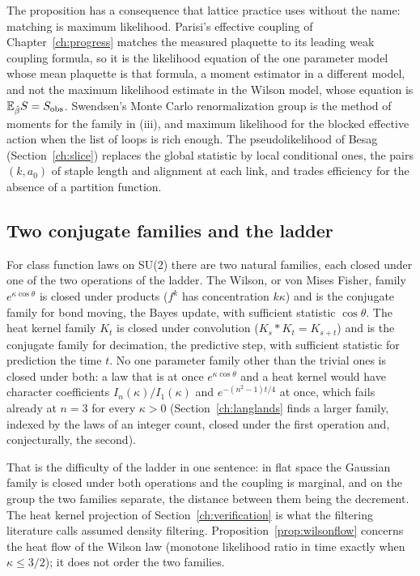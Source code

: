 The proposition has a consequence that lattice practice uses without the name: matching is maximum likelihood. Parisi's effective coupling \cite{Pa80} of Chapter~\ref{ch:progress} matches the measured plaquette to its leading weak coupling formula, so it is the likelihood equation of the one parameter model whose mean plaquette is that formula, a moment estimator in a different model, and not the maximum likelihood estimate in the Wilson model, whose equation is $\mathbb{E}_{\hat\beta}S=S_{\mathrm{obs}}$. Swendsen's Monte Carlo renormalization group \cite{Sw79} is the method of moments for the family in (iii), and maximum likelihood for the blocked effective action when the list of loops is rich enough. The pseudolikelihood of Besag \cite{Be74,Be75} (Section~\ref{ch:slice}) replaces the global statistic by local conditional ones, the pairs $(k,a_0)$ of staple length and alignment at each link, and trades efficiency for the absence of a partition function.

\subsection{Two conjugate families and the ladder}

For class function laws on SU(2) there are two natural families, each closed under one of the two operations of the ladder. The Wilson, or von Mises Fisher, family $e^{\kappa\cos\theta}$ is closed under products ($f^k$ has concentration $k\kappa$) and is the conjugate family for bond moving, the Bayes update, with sufficient statistic $\cos\theta$. The heat kernel family $K_t$ is closed under convolution ($K_s*K_t=K_{s+t}$) and is the conjugate family for decimation, the predictive step, with sufficient statistic for prediction the time $t$. No one parameter family other than the trivial ones is closed under both: a law that is at once $e^{\kappa\cos\theta}$ and a heat kernel would have character coefficients $I_n(\kappa)/I_1(\kappa)$ and $e^{-(n^2-1)t/4}$ at once, which fails already at $n=3$ for every $\kappa>0$ (Section~\ref{ch:langlands} finds a larger family, indexed by the laws of an integer count, closed under the first operation and, conjecturally, the second).

That is the difficulty of the ladder in one sentence: in flat space the Gaussian family is closed under both operations and the coupling is marginal, and on the group the two families separate, the distance between them being the decrement. The heat kernel projection of Section~\ref{ch:verification} is what the filtering literature calls assumed density filtering. Proposition~\ref{prop:wilsonflow} concerns the heat flow of the Wilson law (monotone likelihood ratio in time exactly when $\kappa\le3/2$); it does not order the two families.

